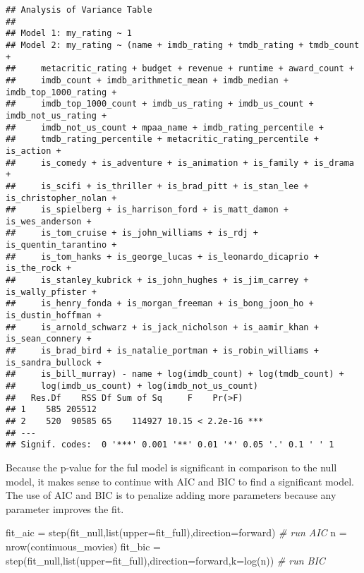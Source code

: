 \documentclass[
]{article}
\newenvironment{Shaded}{\begin{snugshade}}{\end{snugshade}}
\newcommand{\AttributeTok}[1]{\textcolor[rgb]{0.77,0.63,0.00}{#1}}
\newcommand{\CommentTok}[1]{\textcolor[rgb]{0.56,0.35,0.01}{\textit{#1}}}
\newcommand{\FunctionTok}[1]{\textcolor[rgb]{0.00,0.00,0.00}{#1}}
\newcommand{\NormalTok}[1]{#1}
\newcommand{\OtherTok}[1]{\textcolor[rgb]{0.56,0.35,0.01}{#1}}
\newcommand{\StringTok}[1]{\textcolor[rgb]{0.31,0.60,0.02}{#1}}
\begin{document}
\begin{verbatim}
## Analysis of Variance Table
## 
## Model 1: my_rating ~ 1
## Model 2: my_rating ~ (name + imdb_rating + tmdb_rating + tmdb_count + 
##     metacritic_rating + budget + revenue + runtime + award_count + 
##     imdb_count + imdb_arithmetic_mean + imdb_median + imdb_top_1000_rating + 
##     imdb_top_1000_count + imdb_us_rating + imdb_us_count + imdb_not_us_rating + 
##     imdb_not_us_count + mpaa_name + imdb_rating_percentile + 
##     tmdb_rating_percentile + metacritic_rating_percentile + is_action + 
##     is_comedy + is_adventure + is_animation + is_family + is_drama + 
##     is_scifi + is_thriller + is_brad_pitt + is_stan_lee + is_christopher_nolan + 
##     is_spielberg + is_harrison_ford + is_matt_damon + is_wes_anderson + 
##     is_tom_cruise + is_john_williams + is_rdj + is_quentin_tarantino + 
##     is_tom_hanks + is_george_lucas + is_leonardo_dicaprio + is_the_rock + 
##     is_stanley_kubrick + is_john_hughes + is_jim_carrey + is_wally_pfister + 
##     is_henry_fonda + is_morgan_freeman + is_bong_joon_ho + is_dustin_hoffman + 
##     is_arnold_schwarz + is_jack_nicholson + is_aamir_khan + is_sean_connery + 
##     is_brad_bird + is_natalie_portman + is_robin_williams + is_sandra_bullock + 
##     is_bill_murray) - name + log(imdb_count) + log(tmdb_count) + 
##     log(imdb_us_count) + log(imdb_not_us_count)
##   Res.Df    RSS Df Sum of Sq     F    Pr(>F)    
## 1    585 205512                                 
## 2    520  90585 65    114927 10.15 < 2.2e-16 ***
## ---
## Signif. codes:  0 '***' 0.001 '**' 0.01 '*' 0.05 '.' 0.1 ' ' 1
\end{verbatim}

Because the p-value for the ful model is significant in comparison to
the null model, it makes sense to continue with AIC and BIC to find a
significant model. The use of AIC and BIC is to penalize adding more
parameters because any parameter improves the fit.

\begin{Shaded}
\begin{Highlighting}[]
\NormalTok{fit\_aic }\OtherTok{=} \FunctionTok{step}\NormalTok{(fit\_null,}\FunctionTok{list}\NormalTok{(}\AttributeTok{upper=}\NormalTok{fit\_full),}\AttributeTok{direction=}\StringTok{\textquotesingle{}forward\textquotesingle{}}\NormalTok{) }\CommentTok{\# run AIC}
\NormalTok{n }\OtherTok{=} \FunctionTok{nrow}\NormalTok{(continuous\_movies)}
\NormalTok{fit\_bic }\OtherTok{=} \FunctionTok{step}\NormalTok{(fit\_null,}\FunctionTok{list}\NormalTok{(}\AttributeTok{upper=}\NormalTok{fit\_full),}\AttributeTok{direction=}\StringTok{\textquotesingle{}forward\textquotesingle{}}\NormalTok{,}\AttributeTok{k=}\FunctionTok{log}\NormalTok{(n)) }\CommentTok{\# run BIC}
\end{Highlighting}
\end{Shaded}
\end{document}

